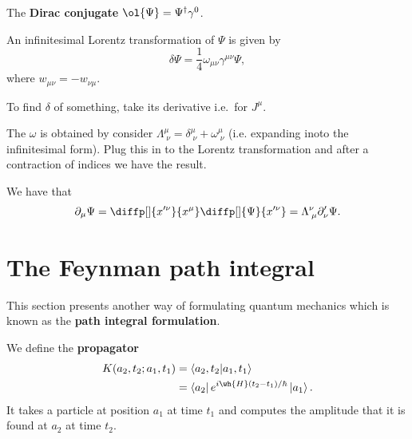 \documentclass[12pt, a4paper]{article}
\begin{document}
\begin{definition}
    The \textbf{Dirac conjugate} \(\ol{\Psi}= \Psi^\dagger \gamma^0\).
\end{definition}

\begin{mdprop}
    An infinitesimal Lorentz transformation of \(\Psi\) is given by 
    \[\delta\Psi = \frac{1}{4} \omega_{\mu\nu} \gamma^{\mu\nu} \Psi,\]
    where \(w_{\mu\nu}=-w_{\nu\mu}\).
\end{mdprop}

\begin{mdnote}
    To find \(\delta\) of something, take its derivative i.e.\ for \(J^\mu\).
\end{mdnote}

\begin{mdnote}
    The \(\omega\) is obtained by consider \(\Lambda^\mu_{\;\nu} = \delta^\mu_{\;\nu}+\omega^\mu_{\;\nu}\) (i.e. expanding inoto the infinitesimal form). Plug this in to the Lorentz transformation and after a contraction of indices we have the result.
\end{mdnote}

\begin{mdthm}
    We have that 
    \[\partial_\mu \Psi = \diffp[]{{x'^\nu}}{{x^\mu}}\diffp[]{\Psi}{{x'^\nu}} = \Lambda^{\nu}_{\;\mu} \partial'_{\nu}\Psi.\]
\end{mdthm}

\section{The Feynman path integral}

This section presents another way of formulating quantum mechanics which is known as the \textbf{path integral formulation}.

\begin{definition}
    We define the \textbf{propagator}
    \[\begin{aligned}
        K(a_2,t_2;a_1,t_1) &= \bra{a_2,t_2}\ket{a_1,t_1} \\
        &= \bra{a_2} e^{i\wh{H}(t_2-t_1)/\hbar}\ket{a_1}.
    \end{aligned}\]
    It takes a particle at position \(a_1\) at time \(t_1\) and computes the amplitude that it is found at \(a_2\) at time \(t_2\).
\end{definition}
\end{document}
